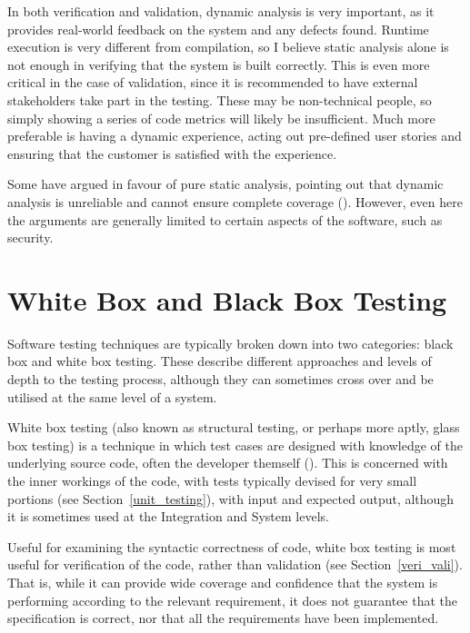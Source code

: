 \documentclass[12pt]{article}
\begin{document}
In both verification and validation, dynamic analysis is very important, as it provides real-world feedback on the system and any defects found. Runtime execution is very different from compilation, so I believe static analysis alone is not enough in verifying that the system is built correctly. This is even more critical in the case of validation, since it is recommended to have external stakeholders take part in the testing. These may be non-technical people, so simply showing a series of code metrics will likely be insufficient. Much more preferable is having a dynamic experience, acting out pre-defined user stories and ensuring that the customer is satisfied with the experience.

Some have argued in favour of pure static analysis, pointing out that dynamic analysis is unreliable and cannot ensure complete coverage (). However, even here the arguments are generally limited to certain aspects of the software, such as security. 



\section{White Box and Black Box Testing} \label{blackwhitebox}

Software testing techniques are typically broken down into two categories: black box and white box testing. These describe different approaches and levels of depth to the testing process, although they can sometimes cross over and be utilised at the same level of a system.

White box testing (also known as structural testing, or perhaps more aptly, glass box testing) is a technique in which test cases are designed with knowledge of the underlying source code, often the developer themself (). This is concerned with the inner workings of the code, with tests typically devised for very small portions (see Section~\ref{unit_testing}), with input and expected output, although it is sometimes used at the Integration and System levels.

Useful for examining the syntactic correctness of code, white box testing is most useful for verification of the code, rather than validation (see Section~\ref{veri_vali}). That is, while it can provide wide coverage and confidence that the system is performing according to the relevant requirement, it does not guarantee that the specification is correct, nor that all the requirements have been implemented.
\end{document}
